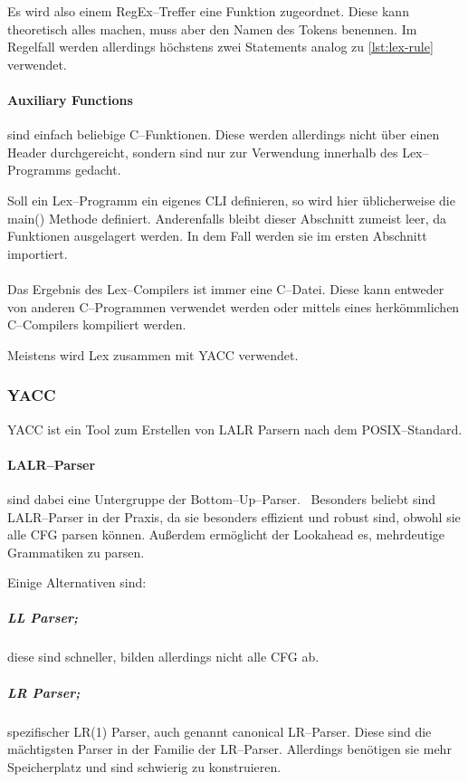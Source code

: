 Es wird also einem \ac{RegEx}--Treffer eine Funktion zugeordnet.
Diese kann theoretisch alles machen, muss aber den Namen des Tokens benennen.
Im Regelfall werden allerdings höchstens zwei Statements analog zu \autoref{lst:lex-rule} verwendet.

\paragraph{Auxiliary Functions} sind einfach beliebige C--Funktionen.
Diese werden allerdings nicht über einen Header durchgereicht, sondern sind nur zur Verwendung innerhalb des Lex--Programms gedacht.

Soll ein Lex--Programm ein eigenes \ac{CLI} definieren, so wird hier üblicherweise die {\ttfamily main()} Methode definiert.
Anderenfalls bleibt dieser Abschnitt zumeist leer, da Funktionen ausgelagert werden.
In dem Fall werden sie im ersten Abschnitt importiert.

\paragraph*{}
Das Ergebnis des Lex--Compilers ist immer eine C--Datei.
Diese kann entweder von anderen C--Programmen verwendet werden oder mittels eines herkömmlichen C--Compilers kompiliert werden.

Meistens wird Lex zusammen mit \ac{YACC} verwendet.

\subsubsection{\acs{YACC}}
\ac{YACC} ist ein Tool zum Erstellen von \ac{LALR} Parsern nach dem \acs{POSIX}--Standard.

\paragraph{\acs{LALR}--Parser} sind dabei eine Untergruppe der Bottom--Up--Parser.~\autocite{aho-2006}
Besonders beliebt sind \acs{LALR}--Parser in der Praxis, da sie besonders effizient und robust sind, obwohl sie alle \ac{CFG} parsen können.
Außerdem ermöglicht der Lookahead es, mehrdeutige Grammatiken zu parsen.

Einige Alternativen sind:

\subparagraph{\ac{LL} Parser;} diese sind schneller, bilden allerdings nicht alle \ac{CFG} ab.

\subparagraph{\ac{LR} Parser;} spezifischer LR(1) Parser, auch genannt canonical \acs{LR}--Parser.
Diese sind die mächtigsten Parser in der Familie der \acs{LR}--Parser.
Allerdings benötigen sie mehr Speicherplatz und sind schwierig zu konstruieren.

